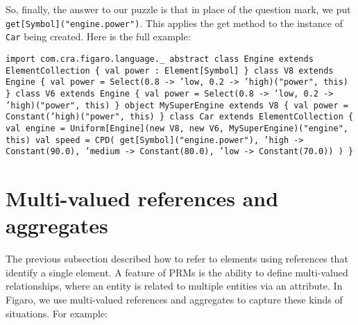 So, finally, the answer to our puzzle is that in place of the question mark, we put \texttt{get[Symbol]("engine.power")}. This applies the get method to the instance of \texttt{Car} being created. Here is the full example:

\begin{flushleft}
\texttt{import com.cra.figaro.language.\_
\newline
\newline abstract class Engine extends ElementCollection \{
\newline \tab val power : Element[Symbol]
\newline \}
\newline class V8 extends Engine \{
\newline \tab val power = Select(0.8 -> 'low, 0.2 -> 'high)("power", this)
\newline \}
\newline class V6 extends Engine \{
\newline \tab val power = Select(0.8 -> 'low, 0.2 -> 'high)("power", this)
\newline \}
\newline object MySuperEngine extends V8 \{
\newline \tab val power = Constant('high)("power", this)
\newline \}
\newline class Car extends ElementCollection \{
\newline \tab val engine = Uniform[Engine](new V8, new V6, MySuperEngine)("engine", this)
\newline \tab val speed = CPD(
\newline \tab get[Symbol]("engine.power"),
\newline \tab 'high -> Constant(90.0),
\newline \tab 'medium -> Constant(80.0),
\newline \tab 'low -> Constant(70.0))
\newline )
\newline \}
}
\end{flushleft}

\section{Multi-valued references and aggregates}

The previous subsection described how to refer to elements using references that identify a single element. A feature of PRMs is the ability to define multi-valued relationships, where an entity is related to multiple entities via an attribute. In Figaro, we use multi-valued references and aggregates to capture these kinds of situations. For example:

